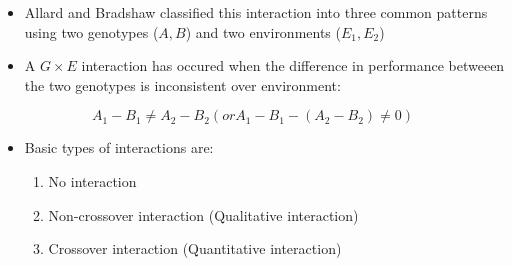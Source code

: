 \documentclass[11pt,dvipsnames,ignorenonframetext,aspectratio=169]{beamer}
\providecommand{\tightlist}{%
  \setlength{\itemsep}{0pt}\setlength{\parskip}{0pt}}
\begin{document}
\begin{frame}{}
\protect\hypertarget{section-1}{}

\begin{itemize}
\tightlist
\item
  Allard and Bradshaw classified this interaction into three common
  patterns using two genotypes (\(A, B\)) and two environments
  (\(E_1, E_2\))
\item
  A \(G \times E\) interaction has occured when the difference in
  performance betweeen the two genotypes is inconsistent over
  environment:
\end{itemize}

\[
A_1 - B_1 \neq A_2 - B_2 (or A_1-B_1 - (A_2-B_2) \neq 0)
\]

\end{frame}

\begin{frame}{}
\protect\hypertarget{section-2}{}

\begin{itemize}
\tightlist
\item
  Basic types of interactions are:

  \begin{enumerate}
  \tightlist
  \item
    No interaction
  \item
    Non-crossover interaction (Qualitative interaction)
  \item
    Crossover interaction (Quantitative interaction)
  \end{enumerate}
\end{itemize}

\end{frame}
\end{document}
